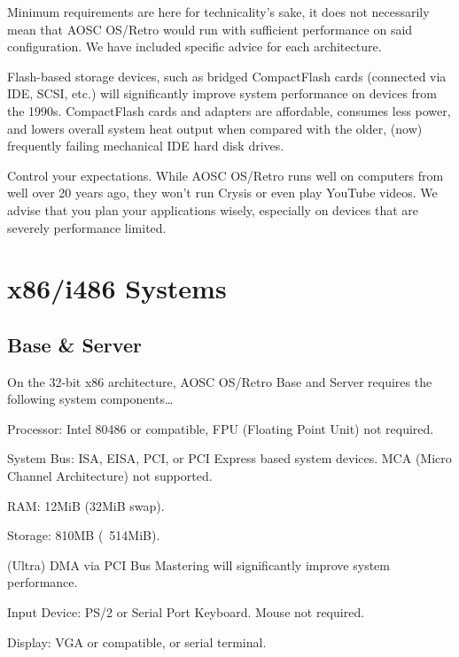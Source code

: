     \begin{compactitem}
        \item Minimum requirements are here for technicality's sake, it does not necessarily mean that AOSC OS/Retro would run with sufficient performance on said configuration. We have included specific advice for each architecture.
        \item Flash-based storage devices, such as bridged CompactFlash cards (connected via IDE, SCSI, etc.) will significantly improve system performance on devices from the 1990s. CompactFlash cards and adapters are affordable, consumes less power, and lowers overall system heat output when compared with the older, (now) frequently failing mechanical IDE hard disk drives.
        \item Control your expectations. While AOSC OS/Retro runs well on computers from well over 20 years ago, they won't run Crysis or even play YouTube videos. We advise that you plan your applications wisely, especially on devices that are severely performance limited.
    \end{compactitem}


    \section{x86/i486 Systems}

    \subsection{Base \& Server}

    On the 32-bit x86 architecture, AOSC OS/Retro Base and Server requires the following system components\ldots

    \begin{compactitem}
        \item Processor: Intel 80486 or compatible, FPU (Floating Point Unit) not required.
        \item System Bus: ISA, EISA, PCI, or PCI Express based system devices. MCA (Micro Channel Architecture) not supported.
        \item RAM: 12MiB (32MiB swap).
        \item Storage: 810MB (~514MiB).
            \begin{compactitem}
                \item (Ultra) DMA via PCI Bus Mastering will significantly improve system performance.
            \end{compactitem}
        \item Input Device: PS/2 or Serial Port Keyboard. Mouse not required.
        \item Display: VGA or compatible, or serial terminal.
    \end{compactitem}

